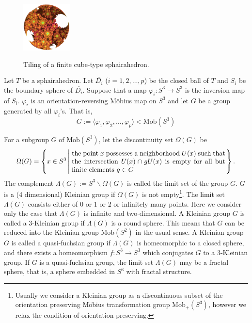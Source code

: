 \documentclass[suppldata, dvipdfmx]{interact}
\theoremstyle{plain}%
\theoremstyle{definition}
\theoremstyle{remark}
\theoremstyle{problemstyle}
\begin{document}
\begin{figure}[H]
 \hspace*{\fill}
 \begin{minipage}[t]{0.18\textwidth}
  \centering
  \includegraphics[width=1in, height=1in, keepaspectratio]{./img/constructFractal/finiteProcess/final.png}
  \label{fig:sphaira-final}
 \end{minipage}
 \hspace*{\fill}
 \caption{Tiling of a finite cube-type sphairahedron.}
 \label{fig:sphairahedronTile}
\end{figure}

Let $T$ be a sphairahedron.  Let $\overline{D_i}$ ($i = 1,2,\ldots, p$) be the closed ball of $T$ and $S_i$ be the boundary sphere of $\overline{D_i}$.  Suppose that a map $\varphi_i:S^3 \to S^3$ is the inversion map of $S_i$.  $\varphi_i$ is an orientation-reversing M\"obius map on $S^3$ and let $G$ be a group generated by all $\varphi_i$'s.  That is,
\[
 G := \langle\varphi_1, \varphi_2, \ldots , \varphi_p  \rangle < \text{Mob}(S^3)
\]

For a subgroup $G$ of
$\text{Mob}(S^3)$, let the discontinuity set $\Omega(G)$ be
\[
\Omega(G) = \left\{ x \in S^3 \left| \hspace{1mm} 
\begin{minipage}{8cm}
the point $x$ possesses a neighborhood $U(x)$
such that the intersection $U(x) \cap gU(x)$ is empty for all but finite
elements $g\in G$
\end{minipage}
 \right. \right\}.
\]
The complement $\Lambda(G) := S^3 \backslash \Omega(G)$ is called the
limit set of the group $G$. $G$ is a (4 dimensional) Kleinian group if $\Omega(G)$ is
not empty\footnote{Usually we consider a Kleinian group as a discontinuous subset of the orientation preserving M\"obius transformation group $\text{Mob}_+(S^3)$, however we relax the condition of orientation preserving.}. The limit set $\Lambda(G)$ consists either of 0 or 1 or 2 or
infinitely many points. Here we consider only the case that $\Lambda(G)$
is infinite and two-dimensional. 
A Kleinian group $G$ is called a
3-Kleinian group if $\Lambda(G)$ is a round sphere. This means that $G$ can be reduced into the Kleinian group $\text{Mob}(S^2)$ in the usual sense.  
A Kleinian group $G$ is called a
quasi-fuchsian group if $\Lambda(G)$ is homeomorphic to a closed sphere, 
and there exists a homeomorphism $f:S^3 \rightarrow S^3$ which conjugates
$G$ to a 3-Kleinian group. If $G$ is a quasi-fuchsian group, the limit set
$\Lambda(G)$ may be a fractal sphere, that is, a sphere embedded in $S^3$ with
 fractal structure.
\end{document}
